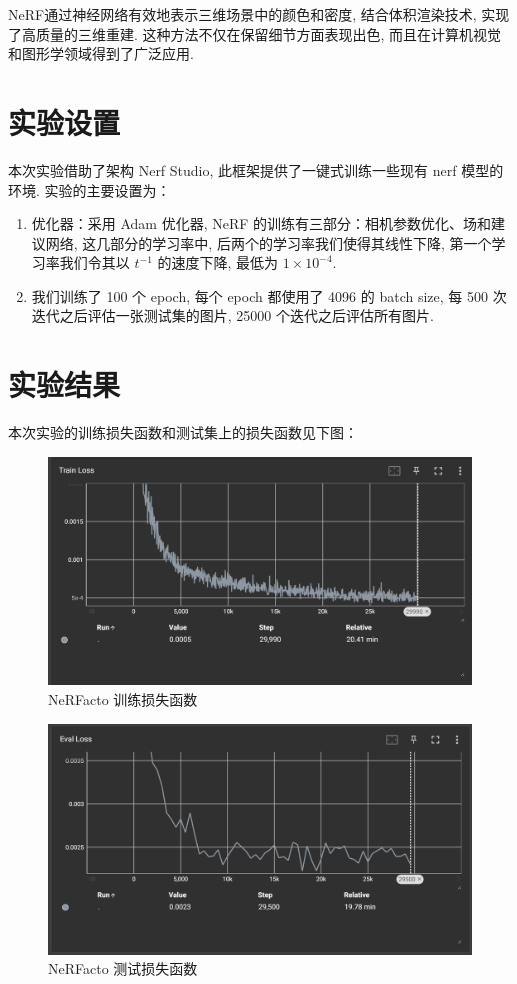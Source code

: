 \documentclass[notitlepage,cs4size,punct,oneside]{ctexrep}
\numberwithin{equation}{chapter}
\theoremstyle{mystyle}
\begin{document}
NeRF通过神经网络有效地表示三维场景中的颜色和密度, 结合体积渲染技术, 实现了高质量的三维重建. 这种方法不仅在保留细节方面表现出色, 而且在计算机视觉和图形学领域得到了广泛应用.



\section{实验设置}
本次实验借助了架构 Nerf Studio, 此框架提供了一键式训练一些现有 nerf 模型的环境. 实验的主要设置为：
\begin{enumerate}
    \item 优化器：采用 Adam 优化器, NeRF 的训练有三部分：相机参数优化、场和建议网络, 这几部分的学习率中, 后两个的学习率我们使得其线性下降, 第一个学习率我们令其以 $t^{-1}$ 的速度下降, 最低为 $1\times 10^{-4}$.

    \item 我们训练了 100 个 epoch, 每个 epoch 都使用了 4096 的 batch size, 每 500 次迭代之后评估一张测试集的图片, 25000 个迭代之后评估所有图片.
\end{enumerate}


\section{实验结果}
本次实验的训练损失函数和测试集上的损失函数见下图：
\begin{figure}[H]
    \centering
    \includegraphics[width=1\linewidth]{nerfloss.png}
    \caption{NeRFacto 训练损失函数}
    \label{fig:enter-label}
\end{figure}

\begin{figure}[H]
    \centering
    \includegraphics[width=1\linewidth]{eval_loss.png}
    \caption{NeRFacto 测试损失函数}
    \label{fig:enter-label}
\end{figure}
\end{document}
